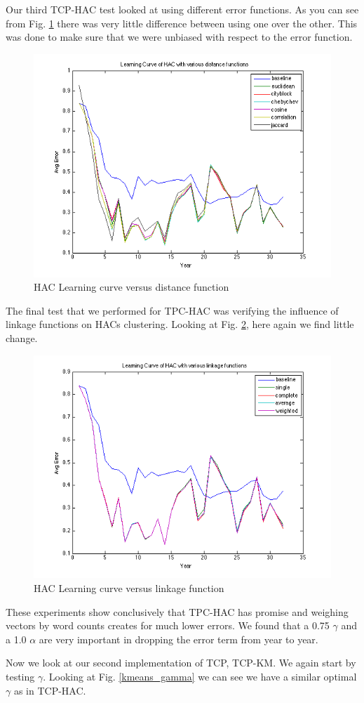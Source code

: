 \documentclass[conference]{IEEEtran}
\begin{document}
Our third TCP-HAC test looked at using different error functions. As you can see from Fig. \ref{hac_dist} there was very little difference between using one over the other. This was done to make sure that we were unbiased with respect to the error function. 

\begin{figure}[h]
	\center
	\includegraphics[width=.50\textwidth]{fig/hac_dist.png}
	\caption{HAC Learning curve versus distance function}
	\label{hac_dist}
\end{figure}

The final test that we performed for TPC-HAC was verifying the influence of linkage functions on HACs clustering. Looking at Fig. \ref{hac_link}, here again we find little change.

\begin{figure}[h]
	\center
	\includegraphics[width=.50\textwidth]{fig/hac_link.png}
	\caption{HAC Learning curve versus linkage function}
	\label{hac_link}
\end{figure}

These experiments show conclusively that TPC-HAC has promise and weighing vectors by word counts creates for much lower errors. We found that a 0.75 $\gamma$ and a 1.0 $\alpha$ are very important in  dropping the error term from year to year.   

Now we look at our second implementation of TCP, TCP-KM. We again start by testing $\gamma$. Looking at Fig. \ref{kmeans_gamma} we can see we have a similar optimal $\gamma$ as in TCP-HAC.
\end{document}
